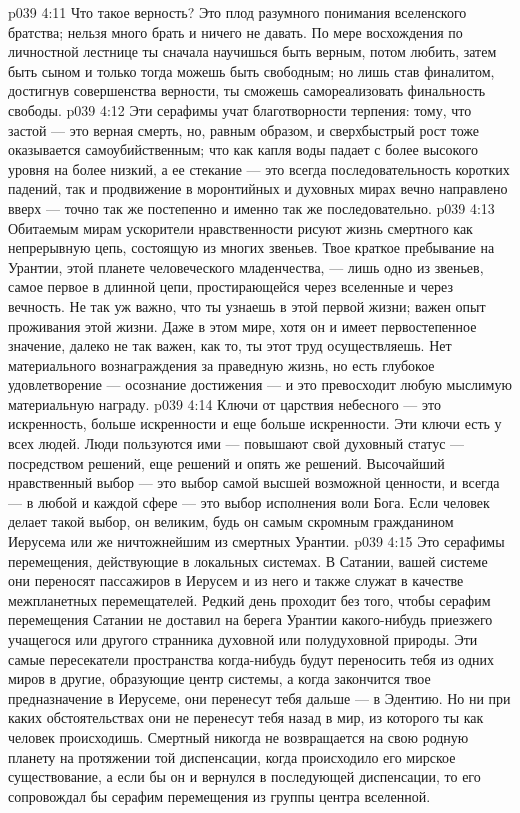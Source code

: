\vs p039 4:11 Что такое верность? Это плод разумного понимания вселенского братства; нельзя много брать и ничего не давать. По мере восхождения по личностной лестнице ты сначала научишься быть верным, потом любить, затем быть сыном и только тогда можешь быть свободным; но лишь став финалитом, достигнув совершенства верности, ты сможешь самореализовать финальность свободы.
\vs p039 4:12 \pc Эти серафимы учат благотворности терпения: тому, что застой --- это верная смерть, но, равным образом, и сверхбыстрый рост тоже оказывается самоубийственным; что как капля воды падает с более высокого уровня на более низкий, а ее стекание --- это всегда последовательность коротких падений, так и продвижение в моронтийных и духовных мирах вечно направлено вверх --- точно так же постепенно и именно так же последовательно.
\vs p039 4:13 Обитаемым мирам ускорители нравственности рисуют жизнь смертного как непрерывную цепь, состоящую из многих звеньев. Твое краткое пребывание на Урантии, этой планете человеческого младенчества, --- лишь одно из звеньев, самое первое в длинной цепи, простирающейся через вселенные и через вечность. Не так уж важно, что ты узнаешь в этой первой жизни; важен опыт проживания этой жизни. Даже  в этом мире, хотя он и имеет первостепенное значение, далеко не так важен, как то,  ты этот труд осуществляешь. Нет материального вознаграждения за праведную жизнь, но есть глубокое удовлетворение --- осознание достижения --- и это превосходит любую мыслимую материальную награду.
\vs p039 4:14 Ключи от царствия небесного --- это искренность, больше искренности и еще больше искренности. Эти ключи есть у всех людей. Люди пользуются ими --- повышают свой духовный статус --- посредством решений, еще решений и опять же решений. Высочайший нравственный выбор --- это выбор самой высшей возможной ценности, и всегда --- в любой и каждой сфере --- это выбор исполнения воли Бога. Если человек делает такой выбор, он  великим, будь он самым скромным гражданином Иерусема или же ничтожнейшим из смертных Урантии.
\vs p039 4:15 \bibnobreakspace {} Это серафимы перемещения, действующие в локальных системах. В Сатании, вашей системе они переносят пассажиров в Иерусем и из него и также служат в качестве межпланетных перемещателей. Редкий день проходит без того, чтобы серафим перемещения Сатании не доставил на берега Урантии какого\hyp{}нибудь приезжего учащегося или другого странника духовной или полудуховной природы. Эти самые пересекатели пространства когда\hyp{}нибудь будут переносить тебя из одних миров в другие, образующие центр системы, а когда закончится твое предназначение в Иерусеме, они перенесут тебя дальше --- в Эдентию. Но ни при каких обстоятельствах они не перенесут тебя назад в мир, из которого ты как человек происходишь. Смертный никогда не возвращается на свою родную планету на протяжении той диспенсации, когда происходило его мирское существование, а если бы он и вернулся в последующей диспенсации, то его сопровождал бы серафим перемещения из группы центра вселенной.
